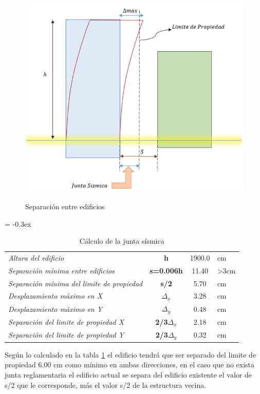 \documentclass{article}%
\begin{document}
\begin{figure}[ht!]%
\centering%
\caption{Separación entre edificios}%
\includegraphics[scale=0.5]{images/sep_edificios.PNG}%
\label{fig:sep_edificios}%
\end{figure}

%


\begin{table}[H]%
\centering%
\caption{Cálculo de la junta sísmica}%
\extrarowheight = -0.3ex%
\renewcommand{\arraystretch}{1.5}%
\begin{tabular}{l|c|c|l}%
\cline{2-3}%
\textit{Altura del edificio} & \textbf{h} & {1900.0} & {cm} \\%
\cline{2-3}%
\textit{Separación mínima entre edificios} & \textbf{s=0.006h} & {11.40} & {>3cm} \\%
\cline{2-3}%
\textit{Separación mínima del limite de propiedad} & \textbf{s/2} & {5.70} & {cm} \\%
\cline{2-3}%
\textit{Desplazamiento máximo en X} & \textbf{$\Delta_x$} & {3.28} & {cm} \\%
\cline{2-3}%
\textit{Desplazamiento máximo en Y} & \textbf{$\Delta_y$} & {0.48} & {cm} \\%
\cline{2-3}%
\textit{Separación del limite de propiedad X} & \textbf{2/3$\Delta_{x}$} & {2.18} & {cm} \\%
\cline{2-3}%
\textit{Separación del limite de propiedad Y} & \textbf{2/3$\Delta_{y}$} & {0.32} & {cm} \\%
\cline{2-3}%
\end{tabular}%
\label{tab:junta_sis}%
\end{table}

%
Según lo calculado en la tabla \ref{tab:junta_sis} %
 el edificio tendrá que ser separado del limite de propiedad 6.00 cm como mínimo en ambas direcciones, en el caso que no exista junta reglamentaria el edificio actual se separa del edificio existente el valor de s/2 que le corresponde, más el valor s/2 de la estructura vecina.

%
\end{document}
